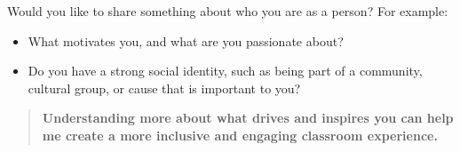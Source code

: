 \documentclass{ximera}
\author{Bart Snapp}
\begin{document}
\begin{question}
    Would you like to share something about who you are as a person? For example:
    \begin{itemize}
        \item What motivates you, and what are you passionate about?
        \item Do you have a strong social identity, such as being part of a
              community, cultural group, or cause
              that is important to you?
    \end{itemize}
    \begin{quote}
    \textbf{Understanding more about what drives and inspires you can help me
    create a more inclusive and engaging classroom experience.}
    \end{quote}
    \begin{freeResponse}
    \end{freeResponse}
\end{question}
\end{document}
